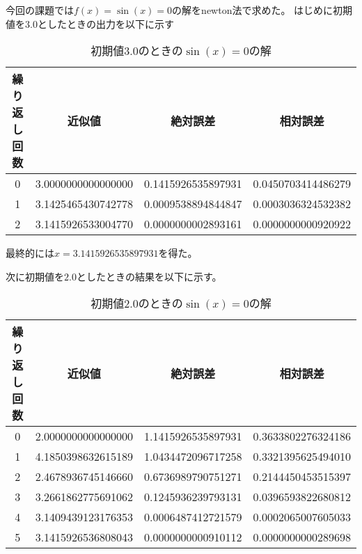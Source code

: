 \documentclass[uplatex,dvipdfmx,a4paper,10pt]{jsarticle}
\begin{document}
            \hspace{1em}今回の課題では$f(x) = \sin(x) = 0$の解をnewton法で求めた。
            はじめに初期値を$3.0$としたときの出力を以下に示す

            \begin{table}[H]
                \begin{center}
                    \caption{初期値$3.0$のときの$\sin(x) = 0$の解}
                    \begin{tabular}{cccc} \hline
                        繰り返し回数 & 近似値 & 絶対誤差 & 相対誤差 \\ \hline
                        0 & 3.0000000000000000 & 0.1415926535897931 & 0.0450703414486279 \\
                        1 & 3.1425465430742778 & 0.0009538894844847 & 0.0003036324532382 \\
                        2 & 3.1415926533004770 & 0.0000000002893161 & 0.0000000000920922 \\ \hline
                    \end{tabular}
                \end{center}
                \label{3-1-初期値3.0のときのsin(x)=0の解}
            \end{table}

            最終的には$x = 3.1415926535897931$を得た。

            次に初期値を$2.0$としたときの結果を以下に示す。

            \begin{table}[H]
                \begin{center}
                    \caption{初期値2.0のときの$\sin(x) = 0$の解}
                    \begin{tabular}{cccc} \hline
                        繰り返し回数 & 近似値 & 絶対誤差 & 相対誤差 \\ \hline
                        0 & 2.0000000000000000 & 1.1415926535897931 & 0.3633802276324186 \\
                        1 & 4.1850398632615189 & 1.0434472096717258 & 0.3321395625494010 \\
                        2 & 2.4678936745146660 & 0.6736989790751271 & 0.2144450453515397 \\
                        3 & 3.2661862775691062 & 0.1245936239793131 & 0.0396593822680812 \\
                        4 & 3.1409439123176353 & 0.0006487412721579 & 0.0002065007605033 \\
                        5 & 3.1415926536808043 & 0.0000000000910112 & 0.0000000000289698 \\ \hline
                    \end{tabular}
                \end{center}
                \label{3-2-初期値2.0のときのsin(x)=0の解}
            \end{table}
\end{document}
